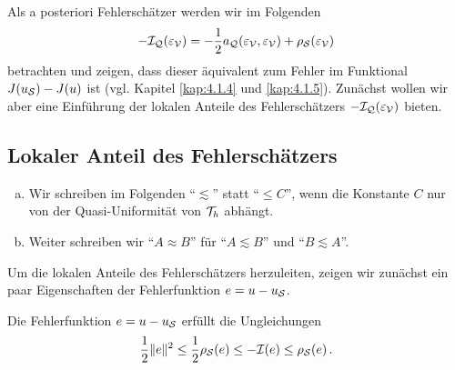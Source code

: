 Als a posteriori Fehlerschätzer werden wir im Folgenden 
\[
	-\mathcal I_{\mathcal Q} (\varepsilon_{\mathcal V})= -\frac 1 2 a_{\mathcal Q}(\varepsilon_{\mathcal V},\varepsilon_{\mathcal V}) + \rho_{\mathcal S}(\varepsilon_{\mathcal V})
\]
betrachten und zeigen, dass dieser äquivalent zum Fehler im Funktional $J(u_{\mathcal S}) - J(u)$ ist (vgl. Kapitel \ref{kap:4.1.4} und \ref{kap:4.1.5}). Zunächst wollen wir aber eine Einführung der lokalen Anteile des Fehlerschätzers $-\mathcal I_{\mathcal Q} (\varepsilon_{\mathcal V})$ bieten.






\subsection{Lokaler Anteil des Fehlerschätzers}
\label{kap:4.1.2}


\begin{notation}
\begin{enumerate}[(a)]
\item Wir schreiben im Folgenden "`$\lesssim$"' statt "`$\le C$"', wenn die Konstante $C$ nur von der Quasi-Uniformität von $\mathcal T_h$ abhängt.
\item Weiter schreiben wir "`$A \approx B$"' für "`$A\lesssim B$"' und "`$B \lesssim A$"'.
\end{enumerate}
\end{notation}


Um die lokalen Anteile des Fehlerschätzers herzuleiten, zeigen wir zunächst ein paar Eigenschaften der Fehlerfunktion $e = u-u_{\mathcal S}$.



\begin{lemma}\label{lem:4.12}
Die Fehlerfunktion $e = u-u_{\mathcal S}$ erfüllt die Ungleichungen
\begin{align}\label{eq:4.14}
	\frac 12 \lVert e\rVert^2 \le \frac 12 \rho_{\mathcal S}(e) \le -\mathcal I (e) \le \rho_{\mathcal S}(e) \, .
\end{align}
\end{lemma}

